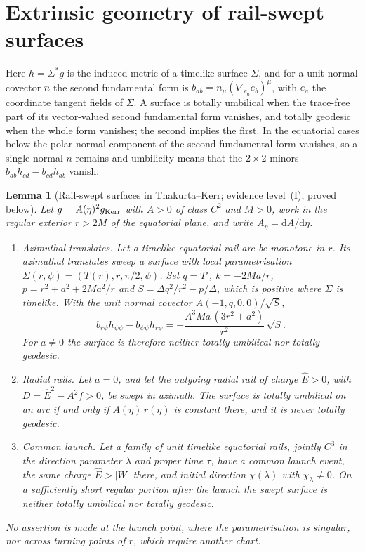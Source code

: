 \documentclass[12pt]{iopart}
\theoremstyle{plain}
\newtheorem{lemma}[proposition]{Lemma}
\theoremstyle{definition}
\theoremstyle{remark}
\newcommand{\Ehat}{\hat E}
\newcommand{\dd}{\mathrm{d}}
\begin{document}
\section{Extrinsic geometry of rail-swept surfaces}
\label{app:rail-surfaces}

Here $h=\Sigma^*g$ is the induced metric of a timelike surface $\Sigma$, and for a unit
normal covector $n$ the second fundamental form is $b_{ab}=n_\mu(\nabla_{e_a}e_b)^\mu$,
with $e_a$ the coordinate tangent fields of $\Sigma$. A surface is totally umbilical when
the trace-free part of its vector-valued second fundamental form vanishes, and totally
geodesic when the whole form vanishes; the second implies the first. In the equatorial
cases below the polar normal component of the second fundamental form vanishes, so a
single normal $n$ remains and umbilicity means that the $2\times2$ minors
$b_{ab}h_{cd}-b_{cd}h_{ab}$ vanish.

\begin{lemma}[Rail-swept surfaces in Thakurta--Kerr; evidence level~(I), proved below]
\label{lem:rail-surfaces}
Let $g=A(\eta)^2g_{\rm Kerr}$ with $A>0$ of class $C^2$ and $M>0$, work in the regular
exterior $r>2M$ of the equatorial plane, and write $A_\eta=\dd A/\dd\eta$.
\begin{enumerate}
\item[\rm(i)] \emph{Azimuthal translates.} Let a timelike equatorial rail arc be monotone
in $r$. Its azimuthal translates sweep a surface with local parametrisation
$\Sigma(r,\psi)=(T(r),r,\pi/2,\psi)$. Set $q=T'$, $k=-2Ma/r$, $p=r^2+a^2+2Ma^2/r$ and
$S=\Delta q^2/r^2-p/\Delta$, which is positive where $\Sigma$ is timelike. With the unit
normal covector $A(-1,q,0,0)/\sqrt S$,
\begin{equation}
    b_{r\psi}h_{\psi\psi}-b_{\psi\psi}h_{r\psi}
    =-\frac{A^3Ma\,(3r^2+a^2)}{r^2}\,\sqrt S .
    \label{eq:rail-surface-minor}
\end{equation}
For $a\neq0$ the surface is therefore neither totally umbilical nor totally geodesic.
\item[\rm(ii)] \emph{Radial rails.} Let $a=0$, and let the outgoing radial rail of
charge $\Ehat>0$, with $D=\Ehat^2-A^2f>0$, be swept in azimuth. The surface is totally
umbilical on an arc if and only if $A(\eta)\,r(\eta)$ is constant there, and it is never
totally geodesic.
\item[\rm(iii)] \emph{Common launch.} Let a family of unit timelike equatorial rails,
jointly $C^3$ in the direction parameter $\lambda$ and proper time $\tau$, have a common
launch event, the same charge $\Ehat>|W|$ there, and initial direction $\chi(\lambda)$
with $\chi_\lambda\neq0$. On a sufficiently short regular portion after the launch the
swept surface is neither totally umbilical nor totally geodesic.
\end{enumerate}
No assertion is made at the launch point, where the parametrisation is singular, nor
across turning points of $r$, which require another chart.
\end{lemma}
\end{document}
